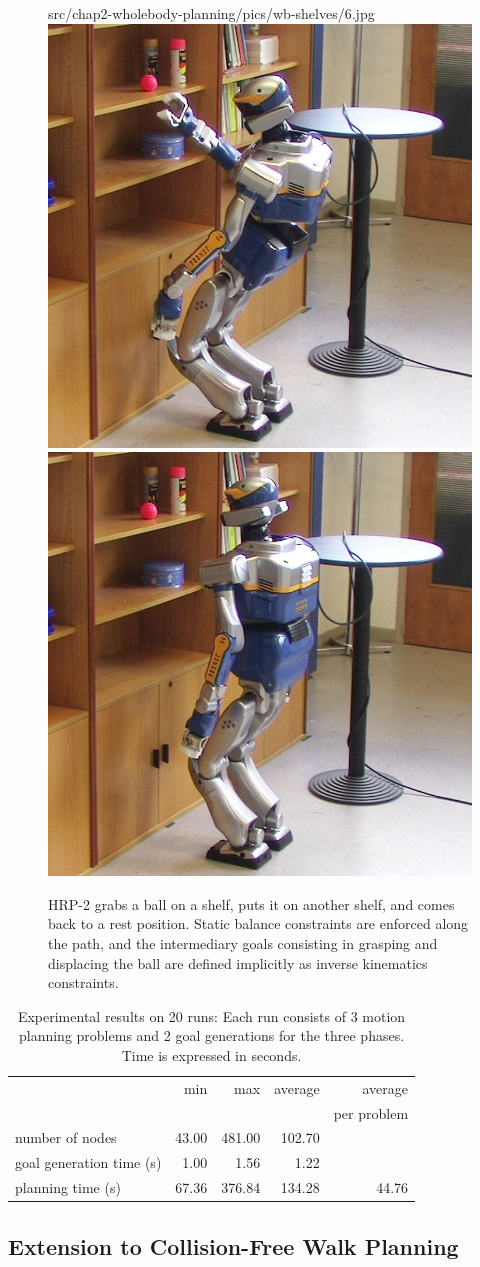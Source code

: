 \begin{figure}
                {src/chap2-wholebody-planning/pics/wb-shelves/6.jpg}
\includegraphics[width=0.24\linewidth]
                {src/chap2-wholebody-planning/pics/wb-shelves/7.jpg}
\includegraphics[width=0.24\linewidth]
                {src/chap2-wholebody-planning/pics/wb-shelves/8.jpg}

\caption{HRP-2 grabs a ball on a shelf, puts it on another shelf, and
  comes back to a rest position. Static balance constraints are
  enforced along the path, and the intermediary goals consisting in
  grasping and displacing the ball are defined implicitly as inverse
  kinematics constraints.}
\label{fig:wb-shelves}
\end{figure}

\begin{table}
\begin{tabular}{l|r|r|r|r|}
\cline{2-5}
& min & max & average & average \\ 
&&&& per problem \\
\hline
\multicolumn{1}{|l|}{number of nodes} & 43.00 & 481.00 & 102.70 \\
\cline{1-4}
\multicolumn{1}{|l|}{goal generation time (s)} & 1.00 & 1.56 & 1.22\\
\hline
\multicolumn{1}{|l|}{planning time (s)} & 67.36 & 376.84 & 134.28 & 44.76\\
\hline
\end{tabular}
\caption {Experimental results on 20 runs: Each run consists of 3
  motion planning problems and 2 goal generations for the three
  phases. Time is expressed in seconds.}
\label{table:reaching}
\end{table}

\subsection{Extension to Collision-Free Walk Planning}
\label{subsec:chap2-constraint-walk-planning}

